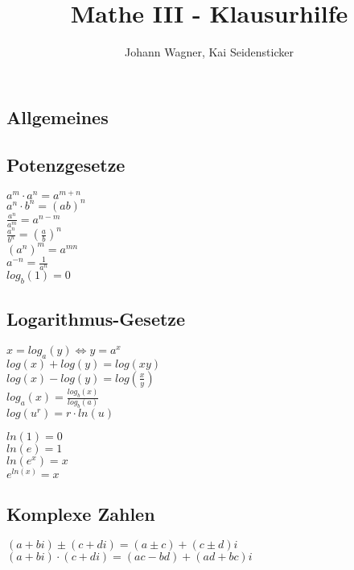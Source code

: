 \documentclass[a4paper,landscape, 11pt]{article}
\author{Johann Wagner, Kai Seidensticker}
\title{Mathe III - Klausurhilfe}
\begin{document}
    \begin{multicols}{4}
        
    
    \begin{small}
    \section{Allgemeines}
        \subsection{Potenzgesetze}
            \begin{multicols}{2}
            $a^m \cdot a^n = a^{m+n}$\\
            $a^n \cdot b^n = (ab)^n$\\
            $\frac{a^n}{a^m} = a^{n-m}$\\
            $\frac{a^n}{b^n} = \left(\frac{a}{b}\right)^n$\\
            $(a^n)^m = a^{mn}$\\
            $a^{-n} = \frac{1}{a^n}$\\
            $log_b(1) = 0$
            \end{multicols}
         \subsection{Logarithmus-Gesetze}
            \noindent
            $x = log_a(y) \Leftrightarrow y = a^x$\\
            $log(x) + log(y) = log(xy)$\\
            $log(x) - log(y) = log(\frac{x}{y})$\\
            $log_a(x) = \frac{log_b(x)}{log_b(a)}$  \\
            $log(u^r) = r \cdot ln(u)$
            \begin{multicols}{2}
            \noindent
            $ln(1) = 0$ \\
            $ln(e) = 1$ \\
            $ln(e^x) = x$ \\
            $e^{ln(x)} = x$
            \end{multicols}
        \subsection{Komplexe Zahlen}
        $(a + bi) \pm (c + di) = (a \pm c) + (c \pm d)i$\\
        $(a + bi) \cdot (c + di) = (ac - bd) + (ad + bc)i$\\
    

\end{small}
\end{multicols}
\end{document}
